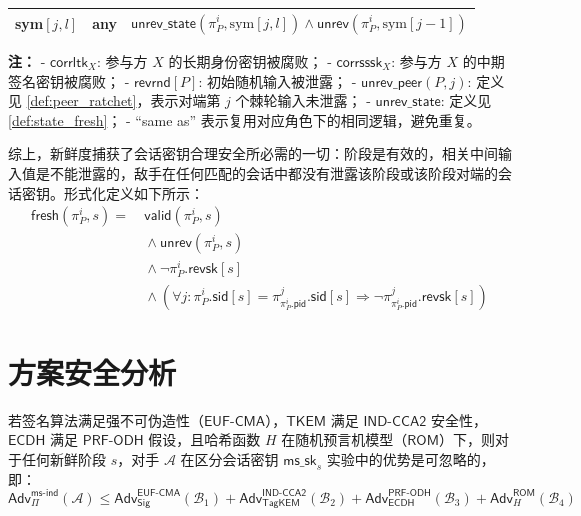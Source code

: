 \begin{definition}[阶段更新输入新鲜度]
\begin{table}[htbp]
\begin{tabular}{@{}lll@{}}
sym$[j,l]$ & any & 
$\mathsf{unrev\_state}(\pi_P^i, \mathrm{sym}[j,l]) \land \mathsf{unrev}(\pi_P^i, \mathrm{sym}[j-1])$ \\ 
\bottomrule
\end{tabular}

\medskip
\footnotesize
\textbf{注：}
- $\mathsf{corrltk}_X$: 参与方 $X$ 的长期身份密钥被腐败；
- $\mathsf{corrsssk}_X$: 参与方 $X$ 的中期签名密钥被腐败；
- $\mathsf{revrnd}[P]$: 初始随机输入被泄露；
- $\mathsf{unrev\_peer}(P,j)$: 定义见 \ref{def:peer_ratchet}，表示对端第 $j$ 个棘轮输入未泄露；
- $\mathsf{unrev\_state}$: 定义见 \ref{def:state_fresh}；
- “same as” 表示复用对应角色下的相同逻辑，避免重复。
\end{table}





\end{definition}


综上，新鲜度捕获了会话密钥合理安全所必需的一切：阶段是有效的，相关中间输入值是不能泄露的，敌手在任何匹配的会话中都没有泄露该阶段或该阶段对端的会话密钥。形式化定义如下所示：
\[
\begin{aligned}
\mathsf{fresh}(\pi_P^i, s) = 
  &\ \mathsf{valid}(\pi_P^i, s) \\
  &\ \land \mathsf{unrev}(\pi_P^i, s) \\
  &\ \land \neg \pi_P^i.\mathsf{revsk}[s] \\
  &\ \land \left( \forall j : \pi_P^i.\mathsf{sid}[s] = 
     \pi_{\pi_P^i.\mathsf{pid}}^j.\mathsf{sid}[s] \Rightarrow 
     \neg \pi_{\pi_P^i.\mathsf{pid}}^j.\mathsf{revsk}[s] \right)
\end{aligned}
\]

\section{方案安全分析}


\begin{theorem}\label{thm:key-indist}
若签名算法满足强不可伪造性（$\mathsf{EUF\text{-}CMA}$），$\mathsf{TKEM}$ 满足 $\mathsf{IND\text{-}CCA2}$ 安全性，$\mathsf{ECDH}$ 满足 $\mathsf{PRF\text{-}ODH}$ 假设，且哈希函数 $H$ 在随机预言机模型（$\mathsf{ROM}$）下，则对于任何新鲜阶段 $s$，对手 $\mathcal{A}$ 在区分会话密钥 $\mathsf{ms\_sk}_s$ 实验中的优势是可忽略的，即：
\begin{equation}
    \mathsf{Adv}_{\Pi}^{\mathsf{ms\text{-}ind}}(\mathcal{A}) \leq \mathsf{Adv}_{\mathsf{Sig}}^{\mathsf{EUF\text{-}CMA}}(\mathcal{B}_1) + \mathsf{Adv}_{\mathsf{TagKEM}}^{\mathsf{IND\text{-}CCA2}}(\mathcal{B}_2) + \mathsf{Adv}_{\mathsf{ECDH}}^{\mathsf{PRF\text{-}ODH}}(\mathcal{B}_3) + \mathsf{Adv}_{H}^{\mathsf{ROM}}(\mathcal{B}_4)
\end{equation}
\end{theorem}

